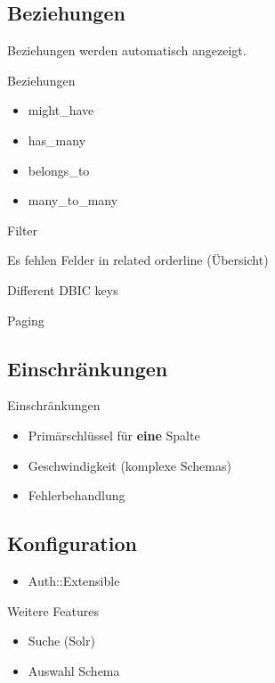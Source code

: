 \subsection{Beziehungen}

Beziehungen werden automatisch angezeigt.

\begin{frame}{Beziehungen}
\begin{itemize}
\item might\_have
\item has\_many
\item belongs\_to
\item many\_to\_many
\end{itemize}
\end{frame}

Filter

Es fehlen Felder in related orderline (Übersicht)

Different DBIC keys

Paging

\subsection{Einschränkungen}
\begin{frame}{Einschränkungen}
\begin{itemize}
\item Primärschlüssel für \textbf{eine} Spalte
\item Geschwindigkeit (komplexe Schemas)
\item Fehlerbehandlung
\end{itemize}
\end{frame}

\subsection{Konfiguration}
\begin{frame}
\begin{itemize}
\item Auth::Extensible
\end{itemize}
\end{frame}

\begin{frame}{Weitere Features}
\begin{itemize}
\item Suche (Solr)
\item Auswahl Schema
\end{itemize}
\end{frame}

